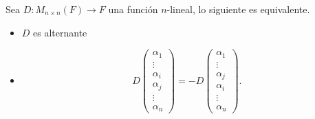 \documentclass[12pt,a4paper]{book}
\begin{document}
    \begin{lema}
    \label{lema:8}
        Sea $D:M_{n \times n}(F) \to F$ una función $n$-lineal, lo siguiente es equivalente.
        \begin{itemize}
            \item[(1)] $D$ es alternante
            \item[(2)]  
            \begin{equation*}
            D\begin{pmatrix}
                \alpha_{1}\\
                \vdots\\
                \alpha_{i}\\
                \alpha_{j}\\
                \vdots\\
                \alpha_{n}
            \end{pmatrix} = -D
            \begin{pmatrix}
                \alpha_{1}\\
                \vdots\\
                \alpha_{j}\\
                \alpha_{i}\\
                \vdots\\
                \alpha_{n}
            \end{pmatrix}.
            \end{equation*}
        \end{itemize}
    \end{lema}
    
\end{document}
